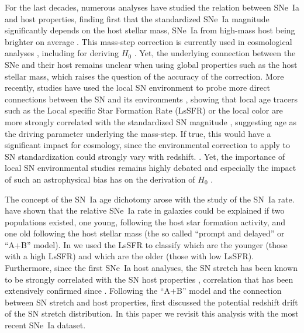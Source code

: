 \documentclass[]{aa}
\begin{document}
For the last decades, numerous analyses have studied the relation between SNe~Ia
and host properties, finding first that the standardized SNe~Ia magnitude
significantly depends on the host stellar mass, SNe~Ia from high-mass host being
brighter on average \cite[e.g.][]{kelly2010, sullivan2010, childress2013,
betoule2014, rigault2018, kim19}. This mass-step correction is currently used in
cosmological analyses \citep[e.g.][]{betoule2014, scolnic2018a}, including for
deriving $H_0$ \citep{riess2016, riess2019}. Yet, the underlying connection
between the SNe and their host remains unclear when using global properties such
as the host stellar mass, which raises the question of the accuracy of the
correction. More recently, studies have used the local SN environment to probe
more direct connections between the SN and its environments \citep{rigault2013},
showing that local age tracers such as the Local specific Star Formation Rate
(LsSFR) or the local color are more strongly correlated with the standardized SN
magnitude \citep{rigault2018, roman2018, kim18}, suggesting age as the driving
parameter underlying the mass-step. If true, this would have a significant
impact for cosmology, since the environmental correction to apply to SN
standardization could strongly vary with redshift. \citep{rigault2013,
childress2014, scolnic2018a}. Yet, the importance of local SN environmental
studies remains highly debated \cite[e.g.][]{jones2015, jones2019} and
especially the impact of such an astrophysical bias has on the derivation of
$H_0$ \citep{jones2015, riess2016, riess2018, rose2019}. 

The concept of the SN~Ia age dichotomy arose with the study of the SN~Ia rate.
\cite{mannucci2005, scannapieco2005, sullivan2006, aubourg2008} have shown that
the relative SNe~Ia rate in galaxies could be explained if two populations
existed, one young, following the host star formation activity, and one old
following the host stellar mass (the so called ``prompt and delayed'' or ``A+B''
model). In \cite{rigault2018} we used the LsSFR to classify which are the
younger (those with a high LsSFR) and which are the older (those with low
LsSFR). Furthermore, since the first SNe~Ia host analyses, the SN stretch has
been known to be strongly correlated with the SN host properties
\citep{hamuy1996, hamuy2000}, correlation that has been extensively confirmed
since \citep[e.g.][]{neill2009, sullivan2010, lampeitl2010, kelly2010,
gupta2011, dandrea2011, childress2013, rigault2013, pan2014, kim19}. Following
the ``A+B'' model and the connection between SN stretch and host properties,
\cite{howell2007} first discussed the potential redshift drift of the SN stretch
distribution. In this paper we revisit this analysis with the most recent SNe~Ia
dataset.
\end{document}

